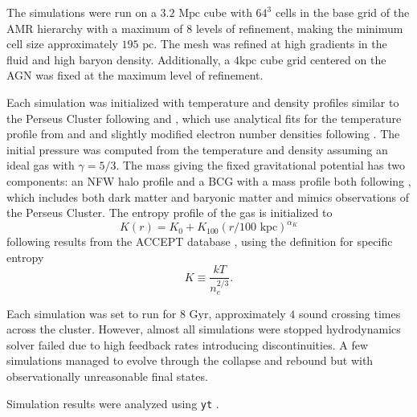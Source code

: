 \documentclass[iop,apjl, twocolappendix]{emulateapj}   %
\begin{document}
The simulations were run on a $3.2 \text{ Mpc}$ cube with $64^3$ cells in the
base grid of the AMR hierarchy with a maximum of $8$ levels of refinement,
making the minimum cell size approximately $195 \text{ pc}$. The mesh was
refined at high gradients in the fluid and high baryon density. Additionally, a $4 \text{
  kpc}$ cube grid centered on the AGN was fixed at the maximum level of
refinement.

Each simulation was initialized with temperature and density profiles similar
to the Perseus Cluster following \citep{li_simulating_2012} and
\citep{meece_triggering_2017}, which use analytical fits for the temperature
profile from \citep{churazov_xmm-newton_2004} and
\citep{vikhlinin_chandra_2006} and slightly modified electron number densities
following \citep{mathews_heating_2006}. The initial pressure was computed from
the temperature and density assuming an ideal gas with $\gamma=5/3$. The mass
giving the fixed gravitational potential has two components: an NFW halo
profile and a BCG with a mass profile both following
\citep{li_simulating_2012}, which includes both dark matter and baryonic matter
and mimics observations of the Perseus Cluster. The entropy profile of the gas
is initialized to 
\begin{equation}
  K(r) = K_{0} + K_{100} \left ( r/ 100 \text{ kpc} \right )^{\alpha_K}
\end{equation}
following results from the ACCEPT database \citep{cavagnolo_intracluster_2009}, using the definition for specific entropy
\begin{equation}
  K \equiv \frac{ kT}{n_e^{2/3} }.
\end{equation}

Each simulation was set to run for $8 \text{ Gyr}$, approximately $4$ sound
crossing times across the cluster.  However, almost all simulations were
stopped hydrodynamics solver failed due to high feedback rates introducing
discontinuities. A few simulations managed to evolve through the collapse and
rebound but with observationally unreasonable final states. 

Simulation results were analyzed using \texttt{yt} \cite{turk_yt_2011}.
\end{document}
